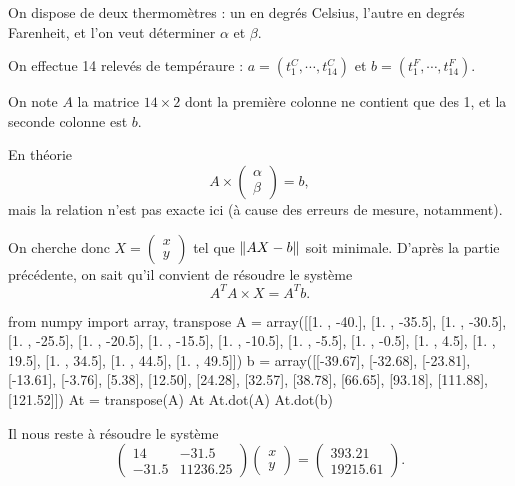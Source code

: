 On dispose de deux thermomètres : un en degrés Celsius, l'autre en degrés Farenheit, et l'on veut déterminer $\alpha$ et $\beta$.

On effectue 14 relevés de tempéraure : $a=(t^C_1,\cdots,t^C_{14})$ et $b=(t^F_1,\cdots,t^F_{14})$. 

On note $A$ la matrice $14\times 2$ dont la première colonne ne contient que des 1, et la seconde colonne est $b$.

En théorie
\begin{equation*}
  A\times\begin{pmatrix} \alpha\\\beta\end{pmatrix}=b,
\end{equation*}
mais la relation n'est pas exacte ici (à cause des erreurs de mesure, notamment). 

On cherche donc $X=\begin{pmatrix} x\\y\end{pmatrix}$ tel que $\left\Vert {AX-b}\right\Vert$ soit minimale. D'après la partie précédente, on sait qu'il convient de résoudre le système 
\begin{equation*}
  A^TA \times X = A^Tb.
\end{equation*}

\begin{pyconsole}
from numpy import array, transpose
A = array([[1. ,  -40.],
           [1. ,  -35.5],
           [1. ,   -30.5],
           [1. ,   -25.5],
           [1. ,  -20.5],
           [1. ,   -15.5],
           [1. ,   -10.5],
           [1. ,  -5.5],
           [1. ,   -0.5],
           [1. ,   4.5],
           [1. ,  19.5],
           [1. ,   34.5],
           [1. ,   44.5],
           [1. ,   49.5]])
b = array([[-39.67],
           [-32.68],
           [-23.81],
           [-13.61],
           [-3.76],
           [5.38],
           [12.50],
           [24.28],
           [32.57],
           [38.78],
           [66.65],
           [93.18],
           [111.88],
           [121.52]])
At = transpose(A)
At
At.dot(A)
At.dot(b)
\end{pyconsole}
Il nous reste à résoudre le système 
$$\begin{pmatrix} 14 & -31.5\\-31.5&11236.25\end{pmatrix}\begin{pmatrix} 
x\\y\end{pmatrix}=\begin{pmatrix} 393.21\\19215.61\end{pmatrix}.$$

